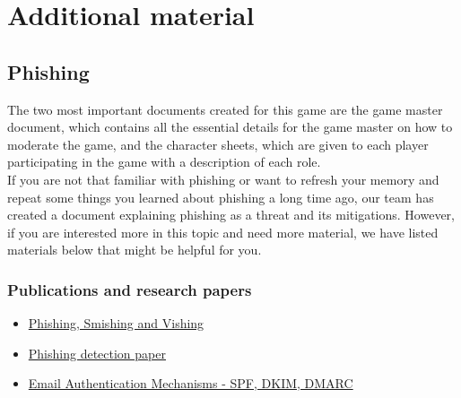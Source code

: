 \chapter{Additional material}
\section{Phishing}
The two most important documents created for this game are the game master document, which contains all the essential details for the game master on how to moderate the game, and the character sheets, which are given to each player participating in the game with a description of each role. \\

If you are not that familiar with phishing or want to refresh your memory and repeat some things you learned about phishing a long time ago, our team has created a document explaining phishing as a threat and its mitigations. However, if you are interested more in this topic and need more material, we have listed materials below that might be helpful for you.

\subsection{Publications and research papers}

\begin{itemize}
    \item \href{https://e-tarjome.com/storage/btn_uploaded/2020-09-12/1599891065_11216-etarjome%20English.pdf}{Phishing, Smishing and Vishing}
    \item \href{https://ieeexplore.ieee.org/abstract/document/6497928}{Phishing detection paper}
    \item \href{https://nvlpubs.nist.gov/nistpubs/TechnicalNotes/NIST.TN.1945.pdf}{Email Authentication Mechanisms - SPF, DKIM, DMARC}
\end{itemize}

